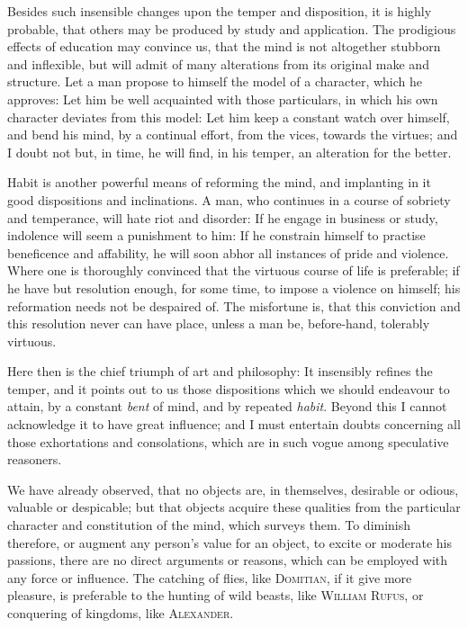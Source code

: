 Besides such insensible changes upon the temper and disposition, it is
highly probable, that others may be produced by study and application.
The prodigious effects of education may convince us, that the mind is
not altogether stubborn and inflexible, but will admit of many
alterations from its original make and structure. Let a man propose to
himself the model of a character, which he approves: Let him be well
acquainted with those particulars, in which his own character deviates
from this model: Let him keep a constant watch over himself, and bend
his mind, by a continual effort, from the vices, towards the virtues;
and I doubt not but, in time, he will find, in his temper, an
alteration for the better.

Habit is another powerful means of reforming the mind, and implanting
in it good dispositions and inclinations. A man, who continues in a
course of sobriety and temperance, will hate riot and disorder: If he
engage in business or study, indolence will seem a punishment to him:
If he constrain himself to practise beneficence and affability, he
will soon abhor all instances of pride and violence. Where one is
thoroughly convinced that the virtuous course of life is preferable;
if he have but resolution enough, for some time, to impose a violence
on himself; his reformation needs not be despaired of. The misfortune
is, that this conviction and this resolution never can have place,
unless a man be, before-hand, tolerably virtuous.

Here then is the chief triumph of art and philosophy: It
insensibly refines the temper, and it points out to us those
dispositions which we should endeavour to attain, by a constant
\textit{bent} of mind, and by repeated \textit{habit}. Beyond this I
cannot acknowledge it to have great influence; and I must entertain
doubts concerning all those exhortations and consolations, which are
in such vogue among speculative reasoners.

We have already observed, that no objects are, in themselves,
desirable or odious, valuable or despicable; but that objects acquire
these qualities from the particular character and constitution of the
mind, which surveys them. To diminish therefore, or augment any
person's value for an object, to excite or moderate his passions,
there are no direct arguments or reasons, which can be employed with
any force or influence. The catching of flies, like \textsc{Domitian},
if it give more pleasure, is preferable to the hunting of wild beasts,
like \textsc{William Rufus}, or conquering of kingdoms, like
\textsc{Alexander}.

